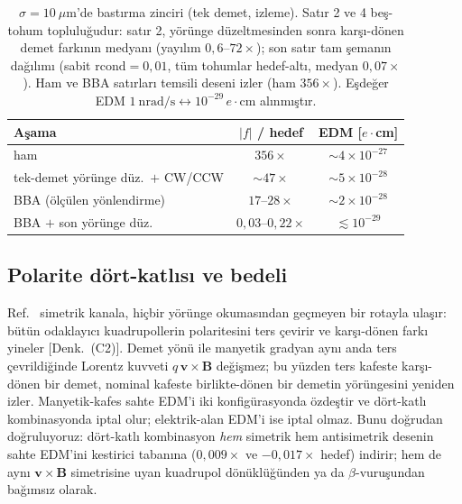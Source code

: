 \documentclass[aps,prab,reprint,superscriptaddress,nofootinbib]{revtex4-2}
\begin{document}
\begin{table}[tb]
\caption{$\sigma = 10~\mu$m'de bastırma zinciri (tek demet, izleme). Satır 2 ve 4
beş-tohum topluluğudur: satır 2, yörünge düzeltmesinden sonra karşı-dönen demet
farkının medyanı (yayılım $0{,}6$--$72\times$); son satır tam şemanın dağılımı
(sabit $\mathrm{rcond}=0{,}01$, tüm tohumlar hedef-altı, medyan $0{,}07\times$). Ham
ve BBA satırları temsili deseni izler (ham $356\times$). Eşdeğer EDM
$1~\text{nrad/s} \leftrightarrow 10^{-29}\,e\!\cdot\!$cm alınmıştır.}
\label{tab:chain}
\small
\begin{ruledtabular}
\begin{tabular}{lcc}
Aşama & $|f|$ / hedef & EDM [$e\!\cdot\!$cm] \\
\hline
ham                            & $356\times$ & $\sim4\times10^{-27}$ \\
tek-demet yörünge düz.\ $+$ CW/CCW & $\sim47\times$ & $\sim5\times10^{-28}$ \\
BBA (ölçülen yönlendirme)      & $17$--$28\times$ & $\sim2\times10^{-28}$ \\
BBA $+$ son yörünge düz.       & $0{,}03$--$0{,}22\times$ & $\lesssim10^{-29}$ \\
\end{tabular}
\end{ruledtabular}
\end{table}

\subsection{Polarite dört-katlısı ve bedeli}
\label{sec:fourfold}

Ref.~\cite{omarov} simetrik kanala, hiçbir yörünge okumasından geçmeyen bir rotayla
ulaşır: bütün odaklayıcı kuadrupollerin polaritesini ters çevirir ve karşı-dönen
farkı yineler [Denk.~(C2)]. Demet yönü ile manyetik gradyan aynı anda ters
çevrildiğinde Lorentz kuvveti $q\,\bm v\times\bm B$ değişmez; bu yüzden ters kafeste
karşı-dönen bir demet, nominal kafeste birlikte-dönen bir demetin yörüngesini
yeniden izler. Manyetik-kafes sahte EDM'i iki konfigürasyonda özdeştir ve dört-katlı
kombinasyonda iptal olur; elektrik-alan EDM'i ise iptal olmaz. Bunu doğrudan
doğruluyoruz: dört-katlı kombinasyon \emph{hem} simetrik hem antisimetrik desenin
sahte EDM'ini kestirici tabanına ($0{,}009\times$ ve $-0{,}017\times$ hedef)
indirir; hem de aynı $\bm v\times\bm B$ simetrisine uyan kuadrupol dönüklüğünden ya
da $\beta$-vuruşundan bağımsız olarak.
\end{document}
